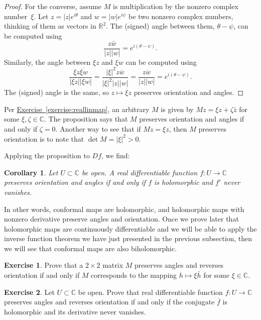\documentclass[12pt,openany]{book}
\newcommand{\sabs}[1]{\lvert {#1} \rvert}
\newcommand{\C}{{\mathbb{C}}}
\newcommand{\R}{{\mathbb{R}}}
\theoremstyle{plain}
\newtheorem{cor}[thm]{Corollary}
\theoremstyle{remark}
\theoremstyle{definition}
\newenvironment{exbox}{%
    \def\FrameCommand{\vrule width 1pt \relax\hspace{10pt}}%
    \MakeFramed{\advance\hsize-\width\FrameRestore}%
}{%
    \endMakeFramed
}
\theoremstyle{exercise}
\newtheorem{exercise}{Exercise}[section]
\theoremstyle{example}
\newcommand{\exerciseref}[1]{\hyperref[#1]{Exercise~\ref*{#1}}}
\begin{document}
\begin{proof}
For the converse, assume $M$ is multiplication by the
nonzero complex number~$\xi$.
Let
$z = \sabs{z} e^{i\theta}$ and $w = \sabs{w} e^{i\psi}$ be two nonzero
complex numbers, thinking of them as vectors in $\R^2$.
The (signed) angle between them, $\theta-\psi$, can be
computed using
\begin{equation*}
\frac{z\bar{w}}{\sabs{z}\sabs{w}}
=
e^{i(\theta-\psi)} .
\end{equation*}
Similarly, the angle between 
$\xi z$ and $\xi w$ can be computed using
\begin{equation*}
\frac{\xi z\overline{\xi w}}{\sabs{\xi z}\sabs{\xi w}} 
=
\frac{\sabs{\xi}^2 z\overline{w}}{\sabs{\xi}^2 \sabs{z}\sabs{w}} 
=
\frac{z\overline{w}}{\sabs{z}\sabs{w}} = e^{i(\theta-\psi)}.
\end{equation*}
The (signed) angle is the same, so $z \mapsto \xi z$ preserves
orientation and angles.
\end{proof}

Per \exerciseref{exercise:reallinmap},
an arbitrary $M$ is given by
$Mz = \xi z + \zeta \bar{z}$ for some $\xi,\zeta \in \C$.
The proposition says that $M$ preserves orientation and angles if and only
if $\zeta=0$.
Another way to see that if $Mz = \xi z$, then
$M$ preserves orientation is to note that
$\det M = \sabs{\xi}^2 > 0$.

Applying the proposition to $Df$, we find:

\begin{cor}
Let $U \subset \C$ be open.
A real differentiable function $f \colon U \to \C$
preserves orientation and angles
if and only if $f$ is holomorphic and $f'$ never vanishes.
\end{cor}

In other words, conformal maps are holomorphic, and holomorphic
maps with nonzero derivative preserve angles and orientation.
Once we prove later that
holomorphic maps are continuously differentiable and we will be able to
apply the inverse function theorem we have just presented in the previous
subsection, then we will see that conformal maps are also biholomorphic.

\begin{exbox}
\begin{exercise}
Prove that a $2 \times 2$ matrix $M$ preserves angles and reverses
orientation if and only if $M$ corresponds to the mapping $h \mapsto \xi
\bar{h}$ for some $\xi \in \C$.
\end{exercise}

\begin{exercise}
Let $U \subset \C$ be open.
Prove that real differentiable function $f \colon U \to \C$ preserves angles
and reverses orientation if and only if the conjugate $\bar{f}$ is
holomorphic and its derivative never vanishes.
\end{exercise}
\end{exbox}
\end{document}
